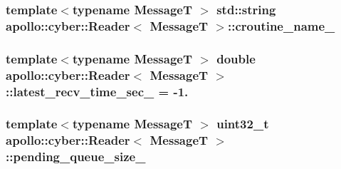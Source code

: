 \hypertarget{classapollo_1_1cyber_1_1Reader_a5320ff9e45bf868262d9bd652c7294d3}{
\subsubsection[{croutine\-\_\-name\-\_\-}]{\setlength{\rightskip}{0pt plus 5cm}template$<$typename Message\-T $>$ std\-::string {\bf apollo\-::cyber\-::\-Reader}$<$ Message\-T $>$\-::croutine\-\_\-name\-\_\-\hspace{0.3cm}{\ttfamily [private]}}}\label{classapollo_1_1cyber_1_1Reader_a5320ff9e45bf868262d9bd652c7294d3}
\hypertarget{classapollo_1_1cyber_1_1Reader_a88776a4339f254a9907c5821f6d1a272}{
\subsubsection[{latest\-\_\-recv\-\_\-time\-\_\-sec\-\_\-}]{\setlength{\rightskip}{0pt plus 5cm}template$<$typename Message\-T $>$ double {\bf apollo\-::cyber\-::\-Reader}$<$ Message\-T $>$\-::latest\-\_\-recv\-\_\-time\-\_\-sec\-\_\- = -\/1.\hspace{0.3cm}{\ttfamily [protected]}}}\label{classapollo_1_1cyber_1_1Reader_a88776a4339f254a9907c5821f6d1a272}
\hypertarget{classapollo_1_1cyber_1_1Reader_a87f1ff71f13f5fee1e4b93b58da506d4}{
\subsubsection[{pending\-\_\-queue\-\_\-size\-\_\-}]{\setlength{\rightskip}{0pt plus 5cm}template$<$typename Message\-T $>$ uint32\-\_\-t {\bf apollo\-::cyber\-::\-Reader}$<$ Message\-T $>$\-::pending\-\_\-queue\-\_\-size\-\_\-\hspace{0.3cm}{\ttfamily [protected]}}}\label{classapollo_1_1cyber_1_1Reader_a87f1ff71f13f5fee1e4b93b58da506d4}
